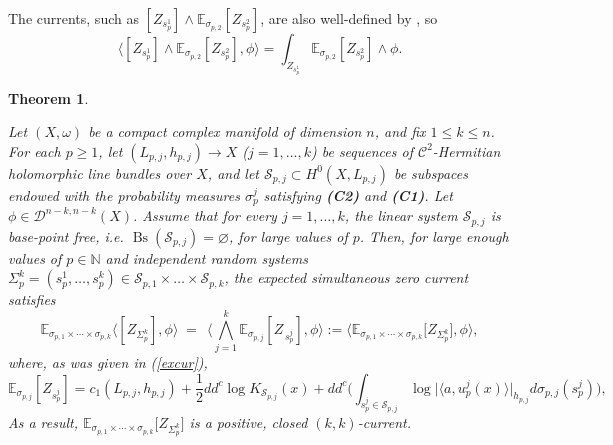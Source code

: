\documentclass[11pt,leqno,oneside]{amsart}
\newtheorem{thm}{Theorem}[section]
\numberwithin{equation}{section}
\begin{document}
The currents, such as $[Z_{s^1_{p}}] \wedge \mathbb{E}_{\sigma_{p, 2}}[Z_{s^2_{p}}]$, are also well-defined by \cite[Chapter 3, Corollary 4.11]{Dem12}, so \begin{equation} \label{restt}\langle [Z_{s^1_{p}}] \wedge \mathbb{E}_{\sigma_{p, 2}}[Z_{s^2_{p}}], \phi \rangle =\int_{Z_{s^1_{p}}}{\mathbb{E}_{\sigma_{p, 2}}[Z_{s^2_{p}}] \wedge \phi}.\end{equation}



\begin{thm} \label{indpw}

Let $(X,\omega)$ be a compact complex manifold of dimension $n$, and fix $1\le k\le n$.
For each $p\geq 1$, let $(L_{p,j},h_{p,j})\to X$ ($j=1,\dots,k$) be sequences of $\mathscr{C}^{2}$-Hermitian holomorphic line bundles over $X$, and let $\mathcal{S}_{p,j}\subset H^0(X,L_{p,j})$ be subspaces endowed with the probability measures $\sigma^{j}_{p}$ satisfying \textbf{(C2)} and \textbf{(C1)}. Let $\phi \in \mathcal{D}^{n-k, n-k}(X)$. Assume that for every $j=1,\ldots,k$,
the linear system $\mathcal{S}_{p,j}$ is base-point free, i.e. $\operatorname{Bs}(\mathcal{S}_{p,j})=\varnothing$, for large values of $p$. Then, for large enough values of $p\in \mathbb{N}$ and independent random systems $\Sigma^k_{p}=(s^{1}_{p}, \ldots, s^{k}_{p})\in \mathcal{S}_{p,1} \times \ldots \times \mathcal{S}_{p, k}$, the expected simultaneous zero current satisfies
$$
\mathbb{E}_{\sigma_{p,1}\times\cdots\times\sigma_{p,k}}\!\big\langle [Z_{\Sigma^{k}_{p}}], \phi \big\rangle
\;=\; \,\!\big\langle \bigwedge_{j=1}^{k} \mathbb{E}_{\sigma_{p,j}}[Z_{\,s^{j}_{p}}] ,\phi \big\rangle:= \langle \mathbb{E}_{\sigma_{p,1}\times\cdots\times\sigma_{p,k}}\big[Z_{\Sigma^{k}_{p}}\big], \phi \rangle,
$$where, as was given in (\ref{excur}), \begin{equation*}
	\mathbb{E}_{\sigma_{p, j}}[Z_{s^{j}_{p}}]=c_{1}(L_{p, j}, h_{p, j}) + \frac{1}{2}dd^{c}\log K_{\mathcal{S}_{p, j}}(x)+dd^{c} \big(\int_{s^{j}_{p} \in \mathcal{S}_{p, j}}{\log\big|\langle a, u^{j}_{p}(x)\rangle\big|_{h_{p, j}} d\sigma_{p, j}(s^{j}_{p})} \big),
\end{equation*} As a result, $\mathbb{E}_{\sigma_{p,1}\times\cdots\times\sigma_{p,k}}\big[Z_{\Sigma^k_{p}}\big]$ is a positive, closed $(k, k)$-current.



\end{thm}
\end{document}
